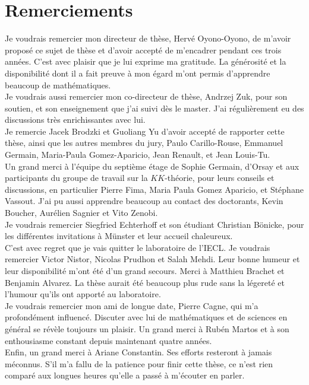\section*{Remerciements}

Je voudrais remercier mon directeur de thèse, Hervé Oyono-Oyono, de m'avoir proposé ce sujet de thèse et d'avoir accepté de m'encadrer pendant ces trois années. C'est avec plaisir que je lui exprime ma gratitude. La générosité et la disponibilité dont il a fait preuve à mon égard m'ont permis d'apprendre beaucoup de mathématiques.\\%

Je voudrais aussi remercier mon co-directeur de thèse, Andrzej Zuk, pour son soutien, et son enseignement que j'ai suivi dès le master. J'ai régulièrement eu des discussions très enrichissantes avec lui.\\

Je remercie Jacek Brodzki et Guoliang Yu d'avoir accepté de rapporter cette thèse, ainsi que les autres membres du jury, Paulo Carillo-Rouse, Emmanuel Germain, Maria-Paula Gomez-Aparicio, Jean Renault, et Jean Louis-Tu.\\   

Un grand merci à l'équipe du septième étage de Sophie Germain, d'Orsay et aux participants du groupe de travail sur la $KK$-théorie, pour leurs conseils et discussions, en particulier Pierre Fima, Maria Paula Gomez Aparicio, et Stéphane Vassout. J'ai pu aussi apprendre beaucoup au contact des doctorants, Kevin Boucher, Aurélien Sagnier et Vito Zenobi. \\

Je voudrais remercier Siegfried Echterhoff et son étudiant Christian Bönicke, pour les différentes invitations à Münster et leur accueil chaleureux.\\

C'est avec regret que je vais quitter le laboratoire de l'IECL. Je voudrais remercier Victor Nistor, Nicolas Prudhon et Salah Mehdi. Leur bonne humeur et leur disponibilité m'ont été d'un grand secours. Merci à Matthieu Brachet et Benjamin Alvarez. La thèse aurait été beaucoup plus rude sans la légereté et l'humour qu'ils ont apporté au laboratoire. \\

Je voudrais remercier mon ami de longue date, Pierre Cagne, qui m'a profondément influencé. Discuter avec lui de mathématiques et de sciences en général se révèle toujours un plaisir. Un grand merci à Rubén Martos et à son enthousiasme constant depuis maintenant quatre années. \\

Enfin, un grand merci à Ariane Constantin. Ses efforts resteront à jamais méconnus. S'il m'a fallu de la patience pour finir cette thèse, ce n'est rien comparé aux longues heures qu'elle a passé à m'écouter en parler.\\   


